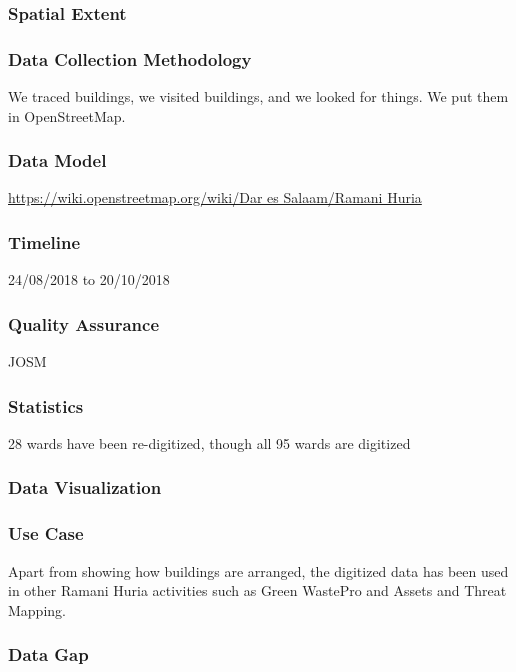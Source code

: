 \documentclass[a4paper,12pt,twoside]{article}
\begin{document}
\subsubsection{Spatial Extent}

\subsubsection{Data Collection Methodology}

We traced buildings, we visited buildings, and we looked for things. We put them in OpenStreetMap.

\subsubsection{Data Model}
\href{https://wiki.openstreetmap.org/wiki/Dar_es_Salaam/Ramani_Huria}{https://wiki.openstreetmap.org/wiki/Dar es Salaam/Ramani Huria}

\subsubsection{Timeline}
24/08/2018 to 20/10/2018

\subsubsection{Quality Assurance}
JOSM

\subsubsection{Statistics}
28 wards have been re-digitized, though all 95 wards are digitized

\subsubsection{Data Visualization}

\subsubsection{Use Case}
Apart from showing how buildings are arranged, the digitized data has been used in other Ramani Huria activities such as Green WastePro and Assets and Threat Mapping.

\subsubsection{Data Gap}
\end{document}
